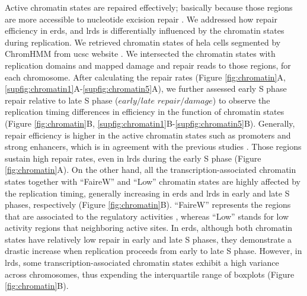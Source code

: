 Active chromatin states are repaired effectively; basically because those regions are more accessible to nucleotide excision repair \citep{adar2016genome}. We addressed how repair efficiency in \gls{erd}s, and \gls{lrd}s is differentially influenced by the chromatin states during replication. We retrieved chromatin states of \gls{hela} cells segmented by ChromHMM from \gls{ucsc} website \citep{ernst2017chromatin}. We intersected the chromatin states with replication domains and mapped damage and repair reads to those regions, for each chromosome. After calculating the repair rates (Figure \ref{fig:chromatin}A, \ref{supfig:chromatin1}A-\ref{supfig:chromatin5}A), we further assessed early S phase repair relative to late S phase (\(early/late\) \(repair/damage\)) to observe the replication timing differences in efficiency in the function of chromatin states (Figure \ref{fig:chromatin}B, \ref{supfig:chromatin1}B-\ref{supfig:chromatin5}B). Generally, repair efficiency is higher in the active chromatin states such as promoters and strong enhancers, which is in agreement with the previous studies \citep{adar2016genome, hu2016cisplatin}. Those regions sustain high repair rates, even in \gls{lrd}s during the early S phase (Figure \ref{fig:chromatin}A). On the other hand, all the transcription-associated chromatin states together with “FaireW” and “Low” chromatin states are highly affected by the replication timing, generally increasing in \gls{erd}s and \gls{lrd}s in early and late S phases, respectively (Figure \ref{fig:chromatin}B). “FaireW” represents the regions that are associated to the regulatory activities \citep{giresi2007faire}, whereas “Low” stands for low activity regions that neighboring active sites. In \gls{erd}s, although both chromatin states have relatively low repair in early and late S phases, they demonstrate a drastic increase when replication proceeds from early to late S phase.  However, in \gls{lrd}s, some transcription-associated chromatin states exhibit a high variance across chromosomes, thus expending the interquartile range of boxplots (Figure \ref{fig:chromatin}B).

